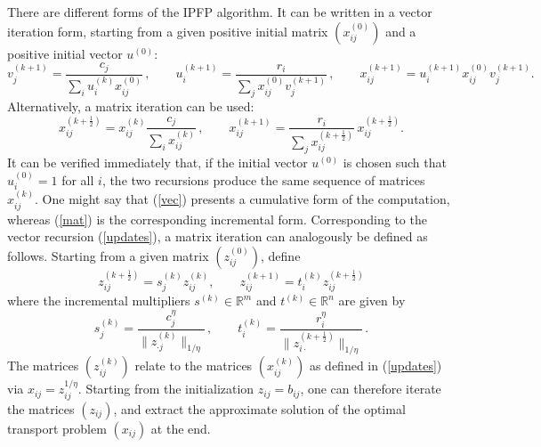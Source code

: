 \documentclass{article}
\newcommand{\mR}{\mathbb{R}}
\theoremstyle{definition}
\begin{document}
There are different forms of the IPFP algorithm. It can be written in a vector iteration form, starting from a given positive initial matrix $(x_{ij}^{(0)})$ and a positive initial vector $u^{(0)}$:
\begin{equation} \label{vec}
v_j^{(k+1)} = \frac{c_j}{\sum_i u_i^{(k)} x_{ij}^{(0)}}\,, \qquad
u_i^{(k+1)} = \frac{r_i}{\sum_j x_{ij}^{(0)} v_j^{(k+1)}}\,, \qquad
x_{ij}^{(k+1)} = u_i^{(k+1)}x_{ij}^{(0)}v_j^{(k+1)}.
\end{equation}
Alternatively, a matrix iteration can be used:
\begin{equation} \label{mat}
x_{ij}^{(k+\frac{1}{2})} = x_{ij}^{(k)} \frac{c_j}{\sum_i x_{ij}^{(k)}}\,, \qquad
x_{ij}^{(k+1)} = \frac{r_i}{\sum_j x_{ij}^{(k+\frac{1}{2})}} \, x_{ij}^{(k+\frac{1}{2})}.
\end{equation}
It can be verified immediately that, if the initial vector $u^{(0)}$ is chosen such that $u_i^{(0)} = 1$ for all $i$, the two recursions
produce the same sequence of matrices $x_{ij}^{(k)}$. One might say that (\ref{vec}) presents a cumulative form of the computation, whereas (\ref{mat}) is the corresponding incremental form. Corresponding to the vector recursion (\ref{updates}), a matrix iteration can
analogously be defined as follows. Starting from a given matrix $(z_{ij}^{(0)})$, define
\begin{equation} \label{upd}
z_{ij}^{(k+\frac{1}{2})} =  s_j^{(k)} z_{ij}^{(k)}, \qquad
z_{ij}^{(k+1)} = t_i^{(k)} z_{ij}^{(k+\frac{1}{2})}
\end{equation}
where the incremental multipliers $s^{(k)} \in \mR^m$ and $t^{(k)} \in \mR^n$ are given by
\begin{equation} \label{incr}
s_j^{(k)} =  \frac{c_j^\eta}{\| z^{(k)}_{\cdot j} \|_{1/\eta}}\,, \qquad
t_i^{(k)} =  \frac{r_i^\eta}{ \| z^{(k+\frac{1}{2})}_{i\cdot} \|_{1/\eta} } \,.
\end{equation}
The matrices $(z_{ij}^{(k)})$ relate to the matrices $(x_{ij}^{(k)})$ as defined in (\ref{updates}) via $x_{ij} = z_{ij}^{1/\eta}$.
Starting from the initialization $z_{ij} = b_{ij}$, one can therefore iterate the matrices $(z_{ij})$, and extract the
approximate solution of the optimal transport problem $(x_{ij})$ at the end.
\end{document}
